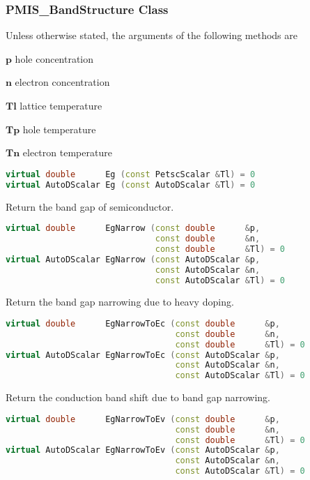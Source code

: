 \documentclass[oneside,12pt]{cgd_book}
\begin{document}
\subsubsection{PMIS\_BandStructure Class}
\label{sec:Extend:PMI:Ref:PMIS:Band}
Unless otherwise stated, the arguments of the following methods are
\par
\begin{compactitem}
\item $\mathbf{p}$ hole concentration
\par
\item $\mathbf{n}$ electron concentration
\par
\item $\mathbf{Tl}$ lattice temperature
\par
\item $\mathbf{Tp}$ hole temperature
\par
\item $\mathbf{Tn}$ electron temperature
\par
\end{compactitem}
\begin{lstlisting}[language={C++}]
virtual double      Eg (const PetscScalar &Tl) = 0
virtual AutoDScalar Eg (const AutoDScalar &Tl) = 0
\end{lstlisting}
Return the band gap of semiconductor.
\par
\begin{lstlisting}[language={C++}]
virtual double      EgNarrow (const double      &p,
                              const double      &n,
                              const double      &Tl) = 0
virtual AutoDScalar EgNarrow (const AutoDScalar &p,
                              const AutoDScalar &n,
                              const AutoDScalar &Tl) = 0
\end{lstlisting}
Return the band gap narrowing due to heavy doping.
\par
\begin{lstlisting}[language={C++}]
virtual double      EgNarrowToEc (const double      &p,
                                  const double      &n,
                                  const double      &Tl) = 0
virtual AutoDScalar EgNarrowToEc (const AutoDScalar &p,
                                  const AutoDScalar &n,
                                  const AutoDScalar &Tl) = 0
\end{lstlisting}
Return the conduction band shift due to band gap narrowing.
\par
\begin{lstlisting}[language={C++}]
virtual double      EgNarrowToEv (const double      &p,
                                  const double      &n,
                                  const double      &Tl) = 0
virtual AutoDScalar EgNarrowToEv (const AutoDScalar &p,
                                  const AutoDScalar &n,
                                  const AutoDScalar &Tl) = 0
\end{lstlisting}
\end{document}
